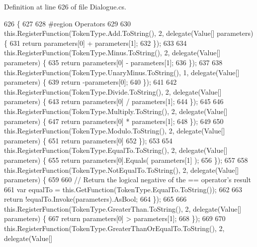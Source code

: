 Definition at line 626 of file Dialogue.\-cs.


\begin{DoxyCode}
626                                      \{
627 
628 \textcolor{preprocessor}{                #region Operators}
629 \textcolor{preprocessor}{}
630                 this.RegisterFunction(TokenType.Add.ToString(), 2, delegate(Value[] parameters) \{
631                     \textcolor{keywordflow}{return} parameters[0] + parameters[1];
632                 \});
633 
634                 this.RegisterFunction(TokenType.Minus.ToString(), 2, delegate(Value[] parameters) \{
635                     \textcolor{keywordflow}{return} parameters[0] - parameters[1];
636                 \});
637 
638                 this.RegisterFunction(TokenType.UnaryMinus.ToString(), 1, delegate(Value[] parameters) \{
639                     \textcolor{keywordflow}{return} -parameters[0];
640                 \});
641 
642                 this.RegisterFunction(TokenType.Divide.ToString(), 2, delegate(Value[] parameters) \{
643                     \textcolor{keywordflow}{return} parameters[0] / parameters[1];
644                 \});
645 
646                 this.RegisterFunction(TokenType.Multiply.ToString(), 2, delegate(Value[] parameters) \{
647                     \textcolor{keywordflow}{return} parameters[0] * parameters[1];
648                 \});
649 
650                 this.RegisterFunction(TokenType.Modulo.ToString(), 2, delegate(Value[] parameters) \{
651                     \textcolor{keywordflow}{return} parameters[0] %
652                 \});
653 
654                 this.RegisterFunction(TokenType.EqualTo.ToString(), 2, delegate(Value[] parameters) \{
655                     \textcolor{keywordflow}{return} parameters[0].Equals( parameters[1] );
656                 \});
657 
658                 this.RegisterFunction(TokenType.NotEqualTo.ToString(), 2, delegate(Value[] parameters) \{
659 
660                     \textcolor{comment}{// Return the logical negative of the == operator's result}
661                     var equalTo = this.GetFunction(TokenType.EqualTo.ToString());
662 
663                     \textcolor{keywordflow}{return} !equalTo.Invoke(parameters).AsBool;
664                 \});
665 
666                 this.RegisterFunction(TokenType.GreaterThan.ToString(), 2, delegate(Value[] parameters) \{
667                     \textcolor{keywordflow}{return} parameters[0] > parameters[1];
668                 \});
669 
670                 this.RegisterFunction(TokenType.GreaterThanOrEqualTo.ToString(), 2, delegate(Value[] 

\end{DoxyCode}
